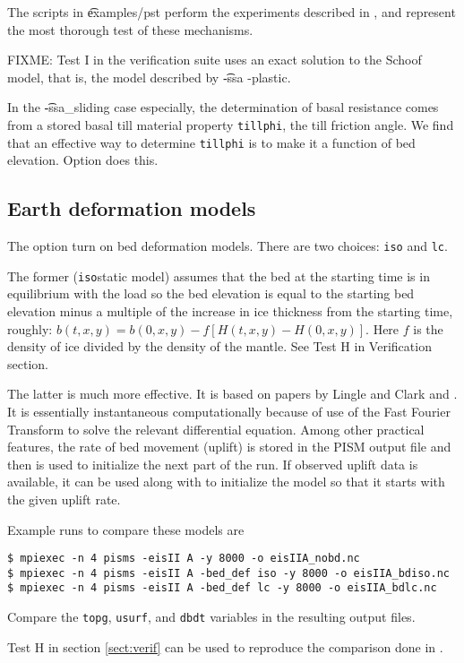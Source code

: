 The scripts in \t{examples/pst} perform the experiments described in \cite{BBssasliding}, and represent the most thorough test of these mechanisms.

FIXME:
Test I in the verification suite uses an exact solution to the Schoof model, that is, the model described by \t{-ssa -plastic}.

In the \t{-ssa_sliding} case especially, the determination of basal resistance comes from a stored basal till material property \texttt{tillphi}, the till friction angle.  We find that an effective way to determine \texttt{tillphi} is to make it a function of bed elevation.  Option  does this.

\subsection{Earth deformation models} \label{subsect:beddef}  
\renewcommand{\optindexsection}{Earth deformation models}

The option  turn on bed deformation models. There are two choices: \texttt{iso} and \texttt{lc}.

The former (\texttt{iso}static model) assumes that the bed at the starting time is in equilibrium with the load so the bed elevation is equal to the starting bed elevation minus a multiple of the increase in ice thickness from the starting time, roughly: $b(t,x,y) = b(0,x,y) - f [H(t,x,y) - H(0,x,y)]$.  Here $f$ is the density of ice divided by the density of the mantle.  See Test H in Verification section. 

The latter is much more effective.  It is based on papers by Lingle and Clark \cite{LingleClark}  and \cite{BLKfastearth}.  It is essentially instantaneous computationally because of use of the Fast Fourier Transform to solve the relevant differential equation.  Among other practical features, the rate of bed movement (uplift) is stored in the PISM output file and then is used to initialize the next part of the run.  If observed uplift data is available, it can be used along with  to initialize the model so that it starts with the given uplift rate.

Example runs to compare these models are
\begin{verbatim}
$ mpiexec -n 4 pisms -eisII A -y 8000 -o eisIIA_nobd.nc
$ mpiexec -n 4 pisms -eisII A -bed_def iso -y 8000 -o eisIIA_bdiso.nc
$ mpiexec -n 4 pisms -eisII A -bed_def lc -y 8000 -o eisIIA_bdlc.nc
\end{verbatim}
Compare the \texttt{topg}, \texttt{usurf}, and \texttt{dbdt} variables in the resulting output files.

Test H in section \ref{sect:verif} can be used to reproduce the comparison done in \cite{BLKfastearth}.


